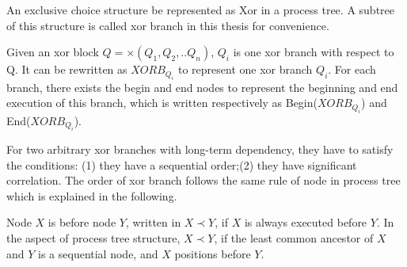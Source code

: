 An exclusive choice structure be represented as Xor in a process tree. A subtree of this structure is called xor branch in this thesis for convenience.
\begin{definition}
Given an xor block $Q= \times(Q_1 , Q_2 ,.. Q_n)$, $Q_i$ is one xor branch with respect to Q. It can be rewritten as $XORB_{Q_i}$ to represent one xor branch $Q_i$. For each branch, there exists the begin and end nodes to represent the beginning and end execution of this branch, which is written respectively as Begin($XORB_{Q_i}$) and End($XORB_{Q_i}$).	
\end{definition}

For two arbitrary xor branches with long-term dependency, they have to satisfy the conditions: (1) they have a sequential order;(2) they have significant correlation.
The order of xor branch follows the same rule of node in process tree which is explained in the following.
\begin{definition}
	Node $X$ is before node $Y$, written in $X \prec Y$, if $X$ is always executed before $Y$.  In the aspect of process tree structure, $X \prec Y$, if the least common ancestor of $X$ and $Y$ is a sequential node, and $X$ positions before $Y$.
\end{definition} 

